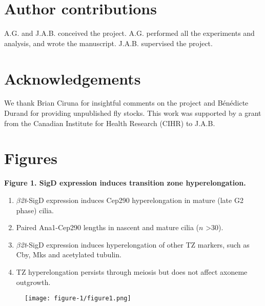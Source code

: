 \documentclass[12pt, twoside, letterpaper]{article}
\newcommand{\sigd}{$\beta$\textit{2t}-SigD}
\begin{document}
\section{Author contributions}
A.G. and J.A.B. conceived the project.
A.G. performed all the experiments and analysis, and wrote the manuscript.
J.A.B. supervised the project.


\section{Acknowledgements}
We thank Brian Ciruna for insightful comments on the project
and Bénédicte Durand for providing unpublished fly stocks.
This work was supported by a grant from the Canadian Institute for Health Research
(CIHR) to J.A.B.




\newpage
\section{Figures}

%
\textbf{Figure 1. SigD expression induces transition zone hyperelongation.} 
\begin{enumerate}[label={(\Alph*)}, nolistsep]
\item \sigd{} expression induces Cep290 hyperelongation in mature (late G2 phase) cilia.  
\item Paired Ana1-Cep290 lengths in nascent and mature cilia ($n$ \textgreater 30). 
\item \sigd{} expression induces hyperelongation of other TZ markers, such as Cby, Mks
  and acetylated tubulin.
\item TZ hyperelongation persists through meiosis but does not affect
  axoneme outgrowth.
\end{enumerate}

\begin{figure}[ht]
  \texttt{[image: figure-1/figure1.png]}
\end{figure}
\newpage
\end{document}
